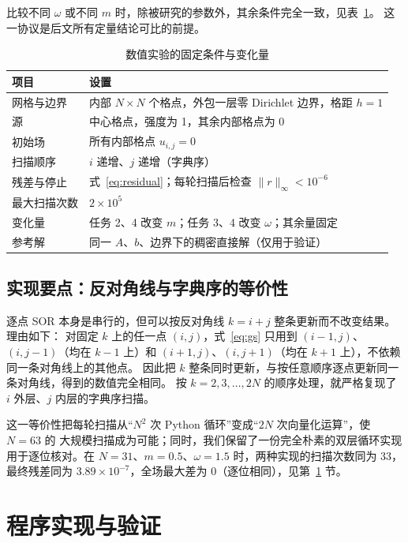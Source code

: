 \documentclass[UTF8,fontset=windows,a4paper,11pt]{ctexart}
\begin{document}
比较不同 $\omega$ 或不同 $m$ 时，除被研究的参数外，其余条件完全一致，见表~\ref{tab:protocol}。
这一协议是后文所有定量结论可比的前提。

\begin{table}[htbp]
\centering
\caption{数值实验的固定条件与变化量}
\label{tab:protocol}
\small
\begin{tabular}{p{3.2cm}p{10.6cm}}
\toprule
项目 & 设置 \\
\midrule
网格与边界 & 内部 $N\times N$ 个格点，外包一层零 Dirichlet 边界，格距 $h=1$ \\
源 & 中心格点，强度为 1，其余内部格点为 0 \\
初始场 & 所有内部格点 $u_{i,j}=0$ \\
扫描顺序 & $i$ 递增、$j$ 递增（字典序） \\
残差与停止 & 式~\eqref{eq:residual}；每轮扫描后检查 $\|r\|_\infty<10^{-6}$ \\
最大扫描次数 & $2\times10^{5}$ \\
变化量 & 任务 2、4 改变 $m$；任务 3、4 改变 $\omega$；其余量固定 \\
参考解 & 同一 $A$、$b$、边界下的稠密直接解（仅用于验证） \\
\bottomrule
\end{tabular}
\end{table}

\subsection{实现要点：反对角线与字典序的等价性}

逐点 SOR 本身是串行的，但可以按反对角线 $k=i+j$ 整条更新而不改变结果。理由如下：
对固定 $k$ 上的任一点 $(i,j)$，式~\eqref{eq:gs} 只用到 $(i-1,j)$、$(i,j-1)$（均在
$k-1$ 上）和 $(i+1,j)$、$(i,j+1)$（均在 $k+1$ 上），不依赖同一条对角线上的其他点。
因此把 $k$ 整条同时更新，与按任意顺序逐点更新同一条对角线，得到的数值完全相同。
按 $k=2,3,\ldots,2N$ 的顺序处理，就严格复现了 $i$ 外层、$j$ 内层的字典序扫描。

这一等价性把每轮扫描从“$N^2$ 次 Python 循环”变成“$2N$ 次向量化运算”，使 $N=63$ 的
大规模扫描成为可能；同时，我们保留了一份完全朴素的双层循环实现用于逐位核对。在
$N=31$、$m=0.5$、$\omega=1.5$ 时，两种实现的扫描次数同为 33，最终残差同为
$3.89\times10^{-7}$，全场最大差为 $0$（逐位相同），见第~\ref{sec:verify} 节。

\section{程序实现与验证}
\label{sec:verify}
\end{document}

